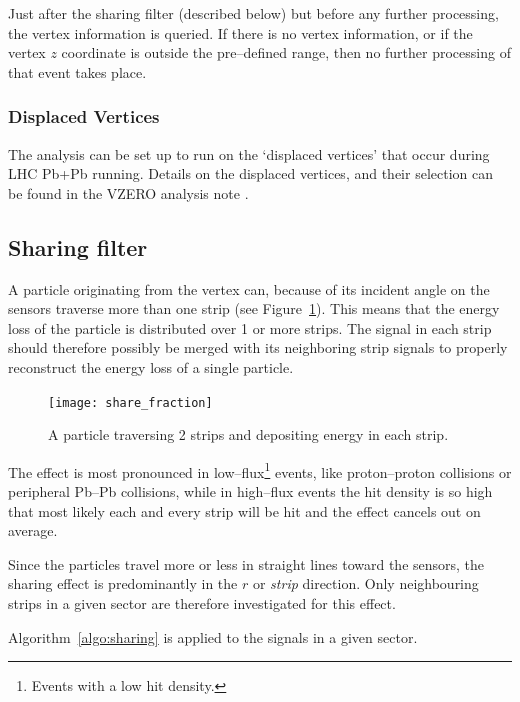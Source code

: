 \documentclass[11pt]{article}
\def\AlwaysText#1{\ifmmode\relax\text{#1}\else #1\fi}
\newcommand{\AbbrName}[1]{\AlwaysText{{\scshape #1}}}
\newcommand{\FMD}[1][]{\AbbrName{fmd\ifx|#1|\else#1\fi}}
\newcommand{\figref}[1]{Figure~\ref{#1}}
\begin{document}
Just after the sharing filter (described below) but before any further
processing, the vertex information is queried.  If there is no vertex
information, or if the vertex $z$ coordinate is outside the
pre--defined range, then no further processing of that event takes place. 

\subsubsection{Displaced Vertices}
\label{sec:sub:sub:dispvtx}

The analysis can be set up to run on the `displaced vertices' that
occur during LHC Pb+Pb running. Details on the displaced vertices, and
their selection can be found in the VZERO analysis note \cite{maxime}.
\subsection{Sharing filter}
\label{sec:sub:sharing_filter}

A particle originating from the vertex can, because of its incident
angle on the \FMD{} sensors traverse more than one strip (see
\figref{fig:share_fraction}).  This means that the energy loss of the
particle is distributed over 1 or more strips.  The signal in each
strip should therefore possibly be merged with its neighboring strip
signals to properly reconstruct the energy loss of a single particle.

\begin{figure}[htbp]
  \centering
  \texttt{[image: share\_fraction]}
  \caption{A particle traversing 2 strips and depositing energy in
    each strip. }
  \label{fig:share_fraction}
\end{figure}

The effect is most pronounced in low--flux\footnote{Events with a low
  hit density.} events, like proton--proton collisions or peripheral
Pb--Pb collisions, while in high--flux events the hit density is so
high that most likely each and every strip will be hit and the effect
cancels out on average.

Since the particles travel more or less in straight lines toward the
\FMD{} sensors, the sharing effect is predominantly in the $r$ or
\emph{strip} direction.  Only neighbouring strips in a given sector are
therefore investigated for this effect.  

Algorithm~\ref{algo:sharing} is applied to the signals in a given
sector.
\end{document}
